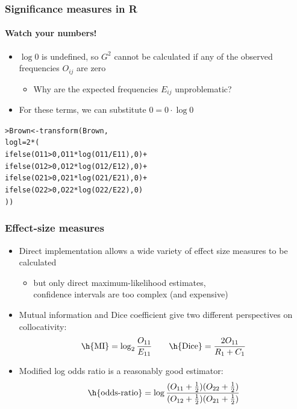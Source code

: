 \documentclass[handout,notes=show,t]{beamer} %
\begin{document}
\begin{frame}[fragile]
  \frametitle{Significance measures in R}
  \framesubtitle{Watch your numbers!}

  \begin{itemize}
  \item $\log 0$ is undefined, so $G^2$ cannot be calculated if any of the
    observed frequencies $O_{ij}$ are zero
    \begin{itemize}
    \item Why are the expected frequencies $E_{ij}$ unproblematic?
    \end{itemize}
    \pause
  \item For these terms, we can substitute $0 = 0\cdot \log 0$
  \end{itemize}

\begin{alltt}
> Brown <- transform(Brown,
  logl = 2 * (
    ifelse(O11>0, O11*log(O11/E11), 0) + 
    ifelse(O12>0, O12*log(O12/E12), 0) + 
    ifelse(O21>0, O21*log(O21/E21), 0) + 
    ifelse(O22>0, O22*log(O22/E22), 0)
  ))
\end{alltt}
\end{frame}


\begin{frame}
  \frametitle{Effect-size measures}

  \begin{itemize}
  \item Direct implementation allows a wide variety of effect size measures to
    be calculated
    \begin{itemize}
    \item but only direct maximum-likelihood estimates,\\
      confidence intervals are too complex (and expensive)
    \end{itemize}
  \item Mutual information and Dice coefficient give two different
    perspectives on collocativity:
    \[
    \text{\h{MI}} = \log_2 \frac{O_{11}}{E_{11}} \qquad
    \text{\h{Dice}} = \frac{2 O_{11}}{R_1 + C_1} 
    \]
  \item Modified log odds ratio is a reasonably good estimator:
    \[
    \text{\h{odds-ratio}} = 
    \log \frac{
      (O_{11} + \frac{1}{2}) (O_{22} + \frac{1}{2})
    }{
      (O_{12} + \frac{1}{2}) (O_{21} + \frac{1}{2})
    }
    \]
  \end{itemize}
\end{frame}
\end{document}
